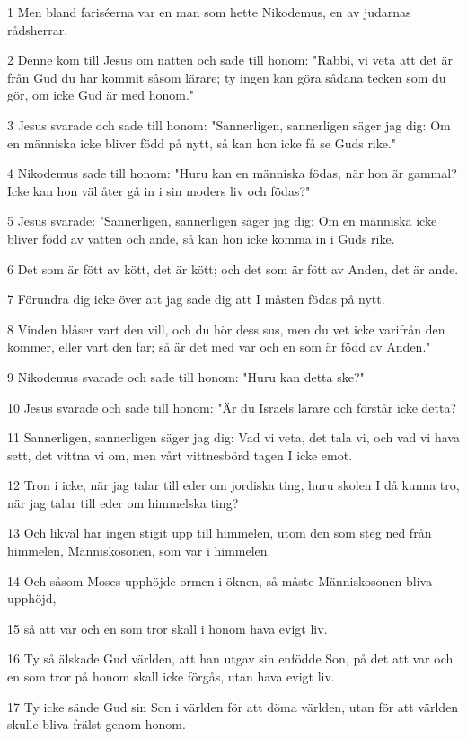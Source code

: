 \par 1 Men bland fariséerna var en man som hette Nikodemus, en av judarnas rådsherrar.
\par 2 Denne kom till Jesus om natten och sade till honom: "Rabbi, vi veta att det är från Gud du har kommit såsom lärare; ty ingen kan göra sådana tecken som du gör, om icke Gud är med honom."
\par 3 Jesus svarade och sade till honom: "Sannerligen, sannerligen säger jag dig: Om en människa icke bliver född på nytt, så kan hon icke få se Guds rike."
\par 4 Nikodemus sade till honom: "Huru kan en människa födas, när hon är gammal? Icke kan hon väl åter gå in i sin moders liv och födas?"
\par 5 Jesus svarade: "Sannerligen, sannerligen säger jag dig: Om en människa icke bliver född av vatten och ande, så kan hon icke komma in i Guds rike.
\par 6 Det som är fött av kött, det är kött; och det som är fött av Anden, det är ande.
\par 7 Förundra dig icke över att jag sade dig att I måsten födas på nytt.
\par 8 Vinden blåser vart den vill, och du hör dess sus, men du vet icke varifrån den kommer, eller vart den far; så är det med var och en som är född av Anden."
\par 9 Nikodemus svarade och sade till honom: "Huru kan detta ske?"
\par 10 Jesus svarade och sade till honom: "Är du Israels lärare och förstår icke detta?
\par 11 Sannerligen, sannerligen säger jag dig: Vad vi veta, det tala vi, och vad vi hava sett, det vittna vi om, men vårt vittnesbörd tagen I icke emot.
\par 12 Tron i icke, när jag talar till eder om jordiska ting, huru skolen I då kunna tro, när jag talar till eder om himmelska ting?
\par 13 Och likväl har ingen stigit upp till himmelen, utom den som steg ned från himmelen, Människosonen, som var i himmelen.
\par 14 Och såsom Moses upphöjde ormen i öknen, så måste Människosonen bliva upphöjd,
\par 15 så att var och en som tror skall i honom hava evigt liv.
\par 16 Ty så älskade Gud världen, att han utgav sin enfödde Son, på det att var och en som tror på honom skall icke förgås, utan hava evigt liv.
\par 17 Ty icke sände Gud sin Son i världen för att döma världen, utan för att världen skulle bliva frälst genom honom.
